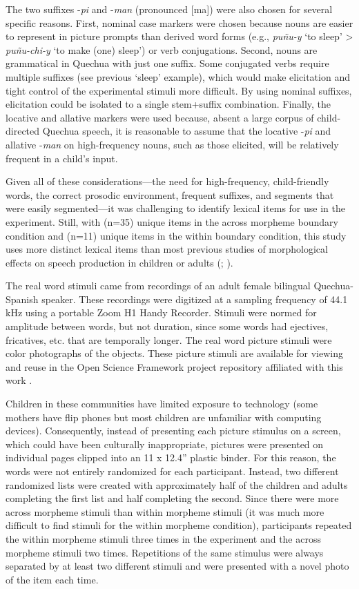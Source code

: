 \documentclass[a4paper,man,floatsintext,natbib,donotrepeattitle, apacite]{apa6}
\begin{document}
The two suffixes -\textit{pi} and -\textit{man} (pronounced [ma\ng]) were also chosen for several specific reasons. First, nominal case markers were chosen because nouns are easier to represent in picture prompts than derived word forms (e.g., \textit{pu{\~n}u-y} `to sleep’ > \textit{pu{\~n}u-chi-y} `to make (one) sleep’) or verb conjugations. Second, nouns are grammatical in Quechua with just one suffix. Some conjugated verbs require multiple suffixes (see previous `sleep’ example), which would make elicitation and tight control of the experimental stimuli more difficult. By using nominal suffixes, elicitation could be isolated to a single stem+suffix combination. Finally, the locative and allative markers were used because, absent a large corpus of child-directed Quechua speech, it is reasonable to assume that the locative -\textit{pi} and allative -\textit{man} on high-frequency nouns, such as those elicited, will be relatively frequent in a child’s input. 

Given all of these considerations---the need for high-frequency, child-friendly words, the correct prosodic environment, frequent suffixes, and segments that were easily segmented---it was challenging to identify lexical items for use in the experiment. Still, with (n=35) unique items in the across morpheme boundary condition and (n=11) unique items in the within boundary condition, this study uses more distinct lexical items than most previous studies of morphological effects on speech production in children or adults (\citealt{lee-kimMorphologicalEffectsDarkness2013}; \citealt{songEffectsCoarticulationMorphological2013}). 

The real word stimuli came from recordings of an adult female bilingual Quechua-Spanish speaker. These recordings were digitized at a sampling frequency of 44.1 kHz using a portable Zoom H1 Handy Recorder. Stimuli were normed for amplitude between words, but not duration, since some words had ejectives, fricatives, etc. that are temporally longer. The real word picture stimuli were color photographs of the objects. These picture stimuli are available for viewing and reuse in the Open Science Framework project repository affiliated with this work \citep{cychoszWordStructureEarly2020}.  

Children in these communities have limited exposure to technology (some mothers have flip phones but most children are unfamiliar with computing devices). Consequently, instead of presenting each picture stimulus on a screen, which could have been culturally inappropriate, pictures were presented on individual pages clipped into an 11 x 12.4'' plastic binder. For this reason, the words were not entirely randomized for each participant. Instead, two different randomized lists were created with approximately half of the children and adults completing the first list and half completing the second. Since there were more across morpheme stimuli than within morpheme stimuli (it was much more difficult to find stimuli for the within morpheme condition), participants repeated the within morpheme stimuli three times in the experiment and the across morpheme stimuli two times. Repetitions of the same stimulus were always separated by at least two different stimuli and were presented with a novel photo of the item each time.   
\end{document}
